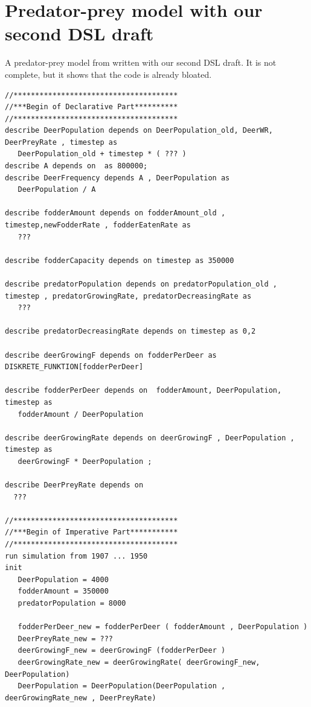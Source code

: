 \section{Predator-prey model with our second DSL draft} \label{sec:second_dsl_draft}
\par
A predator-prey model from \autocite{dsl:dynamo} written with our second DSL draft. It is not complete, but it shows that the code is already bloated.
\newline
\begin{lstlisting}
//**************************************
//***Begin of Declarative Part**********
//**************************************
describe DeerPopulation depends on DeerPopulation_old, DeerWR, DeerPreyRate , timestep as
   DeerPopulation_old + timestep * ( ??? )
describe A depends on  as 800000;
describe DeerFrequency depends A , DeerPopulation as
   DeerPopulation / A  

describe fodderAmount depends on fodderAmount_old , timestep,newFodderRate , fodderEatenRate as
   ???

describe fodderCapacity depends on timestep as 350000

describe predatorPopulation depends on predatorPopulation_old , timestep , predatorGrowingRate, predatorDecreasingRate as
   ???

describe predatorDecreasingRate depends on timestep as 0,2

describe deerGrowingF depends on fodderPerDeer as  DISKRETE_FUNKTION[fodderPerDeer]

describe fodderPerDeer depends on  fodderAmount, DeerPopulation, timestep as
   fodderAmount / DeerPopulation

describe deerGrowingRate depends on deerGrowingF , DeerPopulation , timestep as
   deerGrowingF * DeerPopulation ;       

describe DeerPreyRate depends on
  ???

//**************************************
//***Begin of Imperative Part***********
//**************************************
run simulation from 1907 ... 1950
init
   DeerPopulation = 4000
   fodderAmount = 350000
   predatorPopulation = 8000  

   fodderPerDeer_new = fodderPerDeer ( fodderAmount , DeerPopulation )
   DeerPreyRate_new = ???
   deerGrowingF_new = deerGrowingF (fodderPerDeer )
   deerGrowingRate_new = deerGrowingRate( deerGrowingF_new, DeerPopulation)
   DeerPopulation = DeerPopulation(DeerPopulation , deerGrowingRate_new , DeerPreyRate)
\end{lstlisting}

















 







